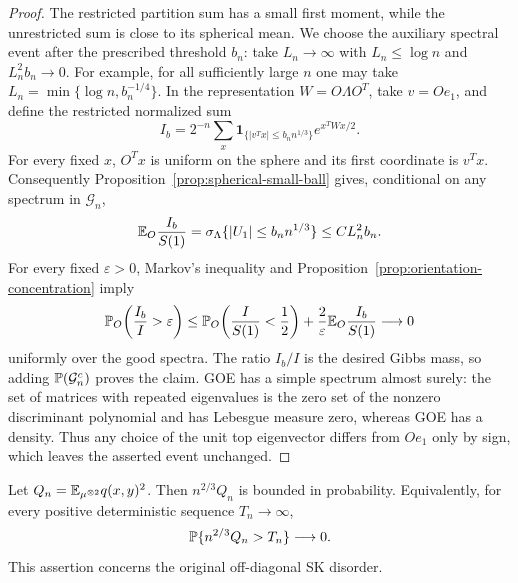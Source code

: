 \begin{proof}
The restricted partition sum has a small first moment, while the
unrestricted sum is close to its spherical mean. We choose the auxiliary
spectral event after the prescribed threshold $b_n$: take $L_n\to\infty$
with $L_n\le\log n$ and $L_n^2b_n\to0$.
For example, for all sufficiently large $n$ one may take
$L_n=\min\{\log n,b_n^{-1/4}\}$.
In the representation $W=O\Lambda O^T$, take $v=Oe_1$, and define the
restricted normalized sum
\[
 I_b=2^{-n}\sum_x
      \mathbf 1_{\{|v^Tx|\le b_n n^{1/3}\}}e^{x^TWx/2}.
\]
For every fixed $x$, $O^Tx$ is uniform on the sphere and its first
coordinate is $v^Tx$.  Consequently Proposition~\ref{prop:spherical-small-ball}
gives, conditional on any spectrum in $\mathcal G_n$,
\begin{equation}
 \mathbb E_O\frac{I_b}{S(1)}
 =\sigma_\Lambda\{|U_1|\le b_n n^{1/3}\}
 \le CL_n^2b_n.
 \label{eq:orientation-restricted-first-moment}
\end{equation}
For every fixed $\varepsilon>0$, Markov's inequality and
Proposition~\ref{prop:orientation-concentration} imply
\[
 \mathbb P_O\!\left(\frac{I_b}{I}>\varepsilon\right)
 \le \mathbb P_O\!\left(\frac{I}{S(1)}<\frac12\right)
       +\frac{2}{\varepsilon}\mathbb E_O\frac{I_b}{S(1)}
 \longrightarrow0
\]
uniformly over the good spectra.  The ratio $I_b/I$ is the desired Gibbs
mass, so adding $\mathbb P(\mathcal G_n^c)$ proves the claim.
GOE has a simple spectrum almost surely: the set of matrices with repeated
eigenvalues is the zero set of the nonzero discriminant polynomial and
has Lebesgue measure zero, whereas GOE has a density.
Thus any choice of the unit top eigenvector differs from $Oe_1$ only by
sign, which leaves the asserted event unchanged.
\end{proof}

\begin{proposition}
\label{prop:overlap}
Let $Q_n=\mathbb E_{\mu^{\otimes2}}q(x,y)^2$.  Then $n^{2/3}Q_n$ is bounded in
probability.  Equivalently, for every positive deterministic sequence
$T_n\to\infty$,
\begin{equation}
 \mathbb P\{n^{2/3}Q_n>T_n\}\longrightarrow0.
 \label{eq:orientation-overlap-tail}
\end{equation}
This assertion concerns the original off-diagonal SK disorder.
\end{proposition}

